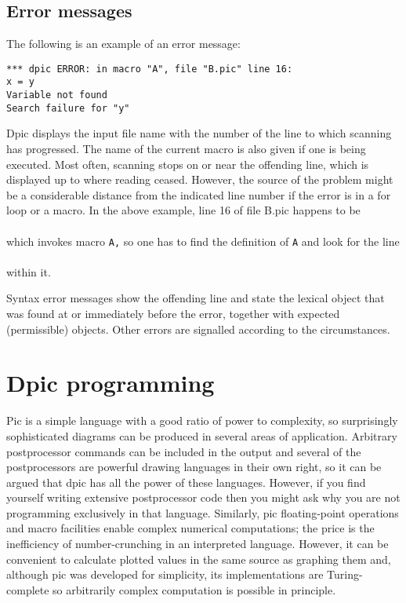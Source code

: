 \documentclass[11pt]{article}
\newcommand{\ntt}[1]{\\\hbox{}\quad{\tt #1}}
\begin{document}
\subsection{Error messages}
The following is an example of an error message:
\begin{verbatim}
*** dpic ERROR: in macro "A", file "B.pic" line 16:
x = y
Variable not found
Search failure for "y"
\end{verbatim}
Dpic displays the input file name with the number of the line to which
scanning has progressed.  The name of the current macro is also given
if one is being executed.  Most often, scanning stops on or near the
offending line, which is displayed up to where reading ceased.  However,
the source of the problem might be a considerable distance from the
indicated line number if the error is in a for loop or a macro.  In the above
example, line 16 of file B.pic happens to be
\ntt{A(5)}\\
which invokes macro {\tt A,}
so one has to find the definition of {\tt A} and look for the line
\ntt{x = y}\\
within it.

Syntax error messages show the offending line and state the lexical
object that was found at or immediately before the error, together with
expected (permissible) objects.  Other errors are signalled according
to the circumstances.


\section{Dpic programming}
Pic is a simple language with a good ratio of power to complexity, so
surprisingly sophisticated diagrams can be produced in several areas of
application.
Arbitrary postprocessor commands can be included in the output and several
of the postprocessors are powerful drawing languages in their own right,
so it can be argued that dpic has all the power of these languages.
However, if you find yourself writing extensive postprocessor code then
you might ask why you are not programming exclusively in that language.
Similarly, pic floating-point operations and macro facilities enable complex
numerical computations; the price is the inefficiency of number-crunching in
an interpreted language. However, it can be convenient to calculate plotted
values in the same source as graphing them and,
although pic was developed for simplicity, its implementations are
Turing-complete so arbitrarily complex computation is possible in
principle.
\end{document}
